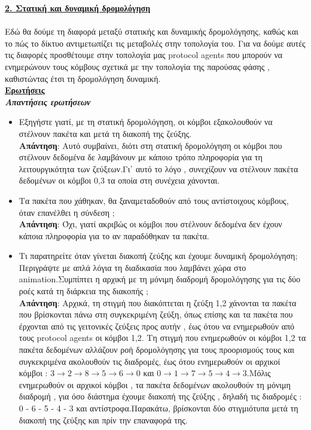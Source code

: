 \documentclass{article}%
\begin{document}
\textbf{{\underline{2. Στατική και δυναμική δρομολόγηση}}} \\\\
Εδώ θα δούμε τη διαφορά μεταξύ στατικής και δυναμικής δρομολόγησης, καθώς και το πώς το δίκτυο αντιμετωπίζει τις μεταβολές στην τοπολογία του. Για να δούμε αυτές τις διαφορές προσθέτουμε στην τοπολογία μας \textlatin{ protocol agents} που μπορούν να ενημερώνουν τους κόμβους σχετικά με την τοπολογία της παρούσας φάσης , καθιστώντας έτσι τη δρομολόγηση δυναμική.\\

\textbf{\underline{Ερωτήσεις}} \\
\textsl{\textbf{{Απαντήσεις ερωτήσεων}}}


\begin{itemize}
	\item Εξηγήστε γιατί, με τη στατική δρομολόγηση, οι κόμβοι εξακολουθούν να στέλνουν
πακέτα και μετά τη διακοπή της ζεύξης.\\ 
	\textbf{Απάντηση}: Αυτό συμβαίνει, διότι στη στατική δρομολόγηση οι κόμβοι που στέλνουν δεδομένα δε λαμβάνουν με κάποιο τρόπο πληροφορία για τη λειτουργικότητα των ζεύξεων.Γι΄ αυτό το λόγο , συνεχίζουν να στέλνουν πακέτα δεδομένων οι κόμβοι 0,3 τα οποία στη συνέχεια χάνονται. 
	\item Τα πακέτα που χάθηκαν, θα ξαναμεταδοθούν από τους αντίστοιχους κόμβους, όταν
επανέλθει η σύνδεση $;$ \\
	\textbf{Απάντηση}: Όχι, γιατί ακριβώς οι κόμβοι που στέλνουν δεδομένα δεν έχουν κάποια πληροφορία για το αν παραδόθηκαν τα πακέτα.
	\item Τι παρατηρείτε όταν γίνεται διακοπή ζεύξης και έχουμε δυναμική δρομολόγηση;
Περιγράψτε με απλά λόγια τη διαδικασία που λαμβάνει χώρα στο animation.Συμπίπτει η
αρχική με τη μόνιμη διαδρομή δρομολόγησης για τις δύο ροές κατά τη διάρκεια της
διακοπής $;$  \\
	\textbf{Απάντηση}: Αρχικά, τη στιγμή που διακόπτεται η ζεύξη 1,2 χάνονται τα πακέτα που βρίσκονται πάνω στη συγκεκριμένη ζεύξη, όπως επίσης και τα πακέτα που έρχονται από τις γειτονικές ζεύξεις προς αυτήν , έως ότου να ενημερωθούν από τους \textlatin{protocol agents} οι κόμβοι 1,2. Τη στιγμή που ενημερωθούν οι κόμβοι 1,2 τα πακέτα δεδομένων αλλάζουν ροή δρομολόγησης για τους προορισμούς τους και συγκεκριμένα ακολουθούν τις διαδρομές, έως ότου ενημερωθούν οι αρχικοί κόμβοι : $3 \rightarrow 2 \rightarrow 8 \rightarrow 5 \rightarrow 6 \rightarrow 0$ και $0 \rightarrow 1 \rightarrow 7 \rightarrow 5\rightarrow 4 \rightarrow 3$.Μόλις ενημερωθούν οι αρχικοί κόμβοι , τα πακέτα δεδομένων ακολουθούν τη μόνιμη διαδρομή , για όσο διάστημα έχουμε διακοπή της ζεύξης , δηλαδή τις διαδρομές : 0 - 6 - 5 - 4 - 3 και αντίστροφα.Παρακάτω, βρίσκονται δύο στιγμιότυπα μετά τη διακοπή της ζεύξης και πρίν την επαναφορά της.

\end{itemize}
\end{document}
